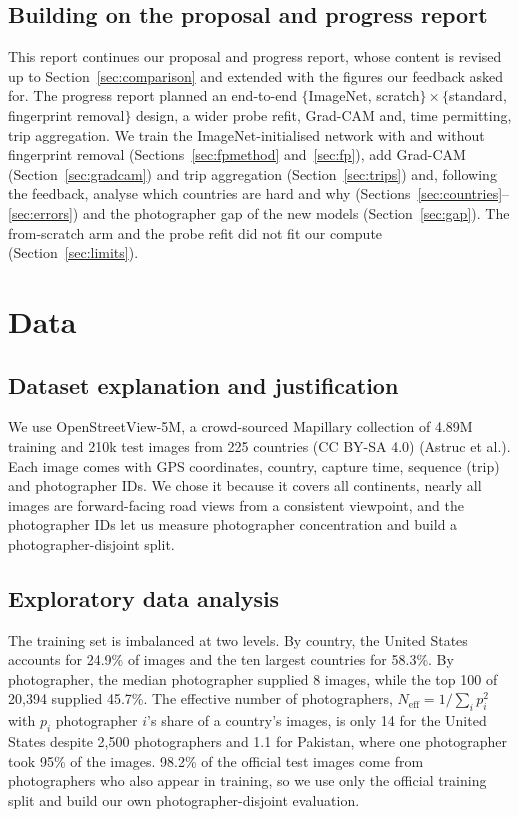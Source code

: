 \documentclass[11pt]{article}
\begin{document}
\subsection{Building on the proposal and progress report}
This report continues our proposal and progress report, whose content is revised up to
Section~\ref{sec:comparison} and extended with the figures our feedback asked for. The progress report
planned an end-to-end $\{$ImageNet, scratch$\}\times\{$standard, fingerprint removal$\}$ design, a wider
probe refit, Grad-CAM and, time permitting, trip aggregation. We train the ImageNet-initialised network
with and without fingerprint removal (Sections~\ref{sec:fpmethod} and~\ref{sec:fp}), add Grad-CAM
(Section~\ref{sec:gradcam}) and trip aggregation (Section~\ref{sec:trips}) and, following the feedback,
analyse which countries are hard and why (Sections~\ref{sec:countries}--\ref{sec:errors}) and the
photographer gap of the new models (Section~\ref{sec:gap}). The from-scratch arm and the probe refit did
not fit our compute (Section~\ref{sec:limits}).

\section{Data}\label{sec:data}
\subsection{Dataset explanation and justification}
We use OpenStreetView-5M, a crowd-sourced Mapillary collection of 4.89M training and 210k test images
from 225 countries (CC BY-SA 4.0) (Astruc et al.). Each image comes with GPS coordinates, country,
capture time, sequence (trip) and photographer IDs. We chose it because it covers all continents, nearly
all images are forward-facing road views from a consistent viewpoint, and the photographer IDs let us
measure photographer concentration and build a photographer-disjoint split.

\subsection{Exploratory data analysis}
The training set is imbalanced at two levels. By country, the United States accounts for 24.9\% of
images and the ten largest countries for 58.3\%. By photographer, the median photographer supplied 8
images, while the top 100 of 20{,}394 supplied 45.7\%. The effective number of photographers,
$N_{\text{eff}}=1/\sum_i p_i^2$ with $p_i$ photographer $i$'s share of a country's images, is only 14 for the
United States despite 2{,}500 photographers and 1.1 for Pakistan, where one photographer took 95\% of the
images. 98.2\% of the official test images come from photographers who also appear in training, so we
use only the official training split and build our own photographer-disjoint evaluation.
\end{document}
